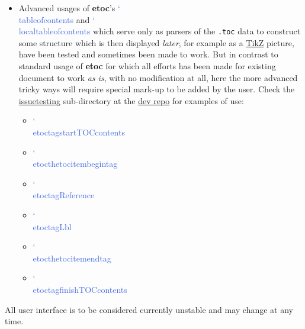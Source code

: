 \documentclass{article}
\DeclareRobustCommand\csa [1]
                {{\ttfamily\hyphenchar\font45 \char`\\ #1}}
\def\csb#1{\textcolor{RoyalBlue}{\csa{#1}}}
\newcommand\etoc{%
        \texorpdfstring{{\color{joli}\ttfamily\bfseries etoc}}{etoc}\xspace}
\newcommand\toc{\csb{tableofcontents}\xspace}
\newcommand\localtoc{\csb{localtableofcontents}\xspace}
\begin{document}
\begin{itemize}
\item Advanced usages of \etoc's \toc and \localtoc which serve only as
  parsers of the \texttt{.toc} data to construct some structure which is then
  displayed \emph{later}, for example as a
  \href{https://ctan.org/pkg/tikz}{TikZ} picture, have been tested and
  sometimes been made to work.  But in contrast to standard usage of \etoc for
  which all efforts has been made for existing document to work \emph{as is},
  with no modification at all, here the more advanced tricky ways will require
  special mark-up to be added by the user.  Check the
  \href{https://github.com/jfbu/etoc/issuetesting}{issuetesting} sub-directory
  at the \href{https://github.com/jfbu/etoc}{dev repo} for examples of use:
  \begin{itemize}
    \item \csb{etoctagstartTOCcontents}
    \item \csb{etocthetocitembegintag}
    \item \csb{etoctagReference}
    \item \csb{etoctagLbl}
    \item \csb{etocthetocitemendtag}
    \item \csb{etoctagfinishTOCcontents}
  \end{itemize}
\end{itemize}

\begingroup{}
\begin{shaded}
  All user interface is to be considered currently unstable and may change at
any time.
\end{shaded}
\endgroup
\end{document}
